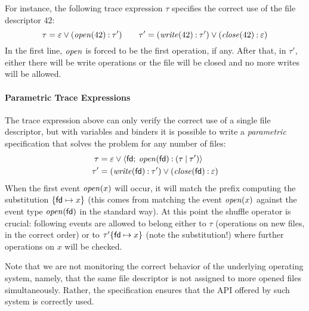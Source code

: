 For instance, the following trace expression \(\tau\) specifies the correct use of the file descriptor \(42\):
$$
	\tau = \varepsilon \mathbin{\vee} (\mathit{open}(42) \mathbin{:} \tau')\qquad
	\tau' = (\mathit{write}(42) \mathbin{:} \tau') \mathbin{\vee} (\mathit{close}(42) \mathbin{:} \varepsilon)
$$
In the first line, \(\mathit{open}\) is forced to be the first operation, if any.
After that, in \(\tau'\), either there will be write operations or the file will be closed and no more writes will be allowed.


\paragraph{Parametric Trace Expressions}
The trace expression above can only verify the correct use of a single file descriptor, but with variables and binders \cite{AnconaFM17} it is possible to write a \emph{parametric} specification that solves the problem for any number of files:
\begin{align}
\label{eq:files1}
\tau &= \varepsilon \mathbin{\vee} {\langle}\mathsf{fd};\:{\mathit{open}(\mathsf{fd}) \mathbin{:} (\tau \mathbin{|} \tau')}{\rangle}\\
\label{eq:files2}
\tau' &= (\mathit{write}(\mathsf{fd}) \mathbin{:} \tau') \mathbin{\vee} (\mathit{close}(\mathsf{fd}) \mathbin{:} \varepsilon)
\end{align}
When the first event \(\mathit{open}(x)\) will occur, it will match the prefix computing the substitution \(\{\mathsf{fd}\mapsto x\}\) (this comes from matching the event \(\mathit{open}(x)\) against the event type \(\mathit{open}(\mathsf{fd})\) in the standard way).
At this point the shuffle operator is crucial:
following events are allowed to belong either to \(\tau\) (operations on new files, in the correct order) or to \(\tau'\{\mathsf{fd}\mapsto x\}\) (note the substitution!) where further operations on \(x\) will be checked.

Note that we are not monitoring the correct behavior of the underlying operating system, namely, that the same file descriptor is not assigned to more opened files simultaneously.
Rather, the specification ensures that the API offered by such system is correctly used.

